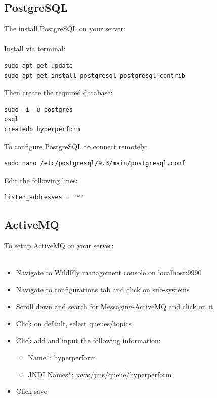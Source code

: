 \documentclass[11pt,a4paper]{article}
\begin{document}
\subsection{PostgreSQL}
The install PostgreSQL on your server: \\\\
Install via terminal:
\begin{lstlisting}
sudo apt-get update
sudo apt-get install postgresql postgresql-contrib
\end{lstlisting}
Then create the required database:
\begin{lstlisting}
sudo -i -u postgres
psql
createdb hyperperform
\end{lstlisting}
To configure PostgreSQL to connect remotely:
\begin{lstlisting}
sudo nano /etc/postgresql/9.3/main/postgresql.conf
\end{lstlisting}
Edit the following lines:
\begin{lstlisting}
listen_addresses = "*"
\end{lstlisting}



\subsection{ActiveMQ}
To setup ActiveMQ on your server: \\\\
\begin{itemize}
	\item Navigate to WildFly management console on localhost:9990
	\item Navigate to configurations tab and click on sub-systems
	\item Scroll down and search for Messaging-ActiveMQ and click on it
	\item Click on default, select queues/topics
	\item Click add and input the following information:
		\begin{itemize}
			\item Name*: hyperperform
			\item JNDI Names*: java:/jms/queue/hyperperform
		\end{itemize}
	\item Click save
\end{itemize}
\end{document}
